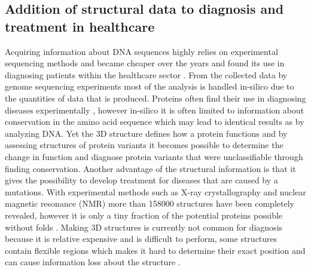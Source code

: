 \subsection{Addition of structural data to diagnosis and treatment in healthcare}
Acquiring information about DNA sequences highly relies on experimental sequencing methods and became cheaper over the years \cite{} and found its use in diagnosing patients within the healthcare sector \cite{}.
From the collected data by genome sequencing experiments most of the analysis is handled in-silico due to the quantities of data that is produced. Proteins often find their use in diagnosing diseases experimentally \cite{}, however in-silico it is often limited to information about conservation in the amino acid sequence which may lead to identical results as by analyzing DNA.
Yet the 3D structure defines how a protein functions \cite{} and by assessing structures of protein variants it becomes possible to determine the change in function and diagnose protein variants that were unclassifiable through finding conservation.
Another advantage of the structural information is that it gives the possibility to develop treatment for diseases that are caused by a mutations. 
With experimental methods such as X-ray crystallography and nuclear magnetic resonance (NMR) more than 158000 structures \cite{} have been completely revealed, however it is only a tiny fraction of the potential proteins possible without folds \cite{}.
Making 3D structures is currently not common for diagnosis because it is relative expensive and is difficult to perform, some structures contain flexible regions which makes it hard to determine their exact position and can cause information loss about the structure \cite{}.
\label{subsec:GD_Addition_of_structural_data}
\newpage

